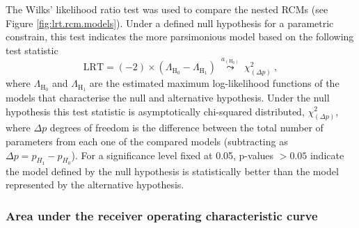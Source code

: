 The Wilks' likelihood ratio test was used to compare the nested RCMs (see Figure \ref{fig:lrt.rcm.models}).
Under a defined null hypothesis for a parametric constrain, this test indicates the more parsimonious model based on the following test statistic
%
\begin{equation}
    \label{eq:lrt}
    \text{LRT} = (-2)\times(\Lambda_{\text{H}_0} - \Lambda_{\text{H}_1})\   \overset{a_{\left(\text{H}_0\right)}}{\leadsto}\    \chi_{(\Delta p)}^{2}\ ,
\end{equation}
%
\noindent
where $\Lambda_{\text{H}_0}$ and $\Lambda_{\text{H}_1}$ are the estimated maximum log-likelihood functions of the models that characterise the null and alternative hypothesis.
Under the null hypothesis this test statistic is asymptotically chi-squared distributed, $\chi_{(\Delta p)}^{2}$, where $\Delta p$ degrees of freedom is the difference between the total number of parameters from each one of the compared models (subtracting as $\Delta p = p_{H_{1}}-p_{H_{0}}$).
For a significance level fixed at 0.05, p-values $>0.05$ indicate the model defined by the null hypothesis is statistically better than the model represented by the alternative hypothesis.



\subsubsection{Area under the receiver operating characteristic curve}

